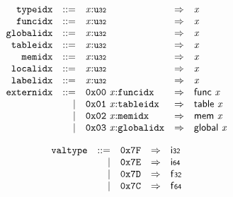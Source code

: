 $$
\begin{array}{@{}l@{}rrlll@{}l@{}}
& {\mathtt{typeidx}} &::=& {\mathit{x}}{:}{\mathtt{u{\scriptstyle32}}} &\Rightarrow& {\mathit{x}} \\
& {\mathtt{funcidx}} &::=& {\mathit{x}}{:}{\mathtt{u{\scriptstyle32}}} &\Rightarrow& {\mathit{x}} \\
& {\mathtt{globalidx}} &::=& {\mathit{x}}{:}{\mathtt{u{\scriptstyle32}}} &\Rightarrow& {\mathit{x}} \\
& {\mathtt{tableidx}} &::=& {\mathit{x}}{:}{\mathtt{u{\scriptstyle32}}} &\Rightarrow& {\mathit{x}} \\
& {\mathtt{memidx}} &::=& {\mathit{x}}{:}{\mathtt{u{\scriptstyle32}}} &\Rightarrow& {\mathit{x}} \\
& {\mathtt{localidx}} &::=& {\mathit{x}}{:}{\mathtt{u{\scriptstyle32}}} &\Rightarrow& {\mathit{x}} \\
& {\mathtt{labelidx}} &::=& {\mathit{x}}{:}{\mathtt{u{\scriptstyle32}}} &\Rightarrow& {\mathit{x}} \\
& {\mathtt{externidx}} &::=& \mathtt{0x00}~{\mathit{x}}{:}{\mathtt{funcidx}} &\Rightarrow& \mathsf{func}~{\mathit{x}} \\ &&|&
\mathtt{0x01}~{\mathit{x}}{:}{\mathtt{tableidx}} &\Rightarrow& \mathsf{table}~{\mathit{x}} \\ &&|&
\mathtt{0x02}~{\mathit{x}}{:}{\mathtt{memidx}} &\Rightarrow& \mathsf{mem}~{\mathit{x}} \\ &&|&
\mathtt{0x03}~{\mathit{x}}{:}{\mathtt{globalidx}} &\Rightarrow& \mathsf{global}~{\mathit{x}} \\
\end{array}
$$

\vspace{1ex}

\vspace{1ex}

$$
\begin{array}{@{}l@{}rrlll@{}l@{}}
& {\mathtt{valtype}} &::=& \mathtt{0x7F} &\Rightarrow& \mathsf{i{\scriptstyle32}} \\ &&|&
\mathtt{0x7E} &\Rightarrow& \mathsf{i{\scriptstyle64}} \\ &&|&
\mathtt{0x7D} &\Rightarrow& \mathsf{f{\scriptstyle32}} \\ &&|&
\mathtt{0x7C} &\Rightarrow& \mathsf{f{\scriptstyle64}} \\
\end{array}
$$

\vspace{1ex}

